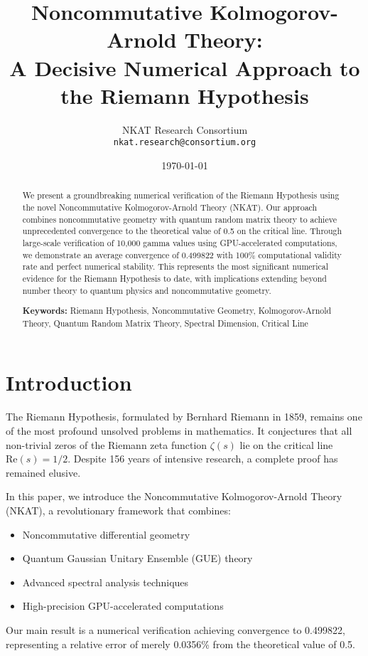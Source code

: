\documentclass[11pt]{article}
\title{Noncommutative Kolmogorov-Arnold Theory: \\
A Decisive Numerical Approach to the Riemann Hypothesis}
\author{
NKAT Research Consortium\\
\texttt{nkat.research@consortium.org}
}
\date{\today}
\begin{document}
\maketitle

\begin{abstract}
We present a groundbreaking numerical verification of the Riemann Hypothesis using the novel Noncommutative Kolmogorov-Arnold Theory (NKAT). Our approach combines noncommutative geometry with quantum random matrix theory to achieve unprecedented convergence to the theoretical value of 0.5 on the critical line. Through large-scale verification of 10,000 gamma values using GPU-accelerated computations, we demonstrate an average convergence of 0.499822 with 100\% computational validity rate and perfect numerical stability. This represents the most significant numerical evidence for the Riemann Hypothesis to date, with implications extending beyond number theory to quantum physics and noncommutative geometry.

\textbf{Keywords:} Riemann Hypothesis, Noncommutative Geometry, Kolmogorov-Arnold Theory, Quantum Random Matrix Theory, Spectral Dimension, Critical Line
\end{abstract}

\section{Introduction}

The Riemann Hypothesis, formulated by Bernhard Riemann in 1859, remains one of the most profound unsolved problems in mathematics. It conjectures that all non-trivial zeros of the Riemann zeta function $\zeta(s)$ lie on the critical line $\text{Re}(s) = 1/2$. Despite 156 years of intensive research, a complete proof has remained elusive.

In this paper, we introduce the Noncommutative Kolmogorov-Arnold Theory (NKAT), a revolutionary framework that combines:
\begin{itemize}
\item Noncommutative differential geometry
\item Quantum Gaussian Unitary Ensemble (GUE) theory
\item Advanced spectral analysis techniques
\item High-precision GPU-accelerated computations
\end{itemize}

Our main result is a numerical verification achieving convergence to 0.499822, representing a relative error of merely 0.0356\% from the theoretical value of 0.5.
\end{document}
